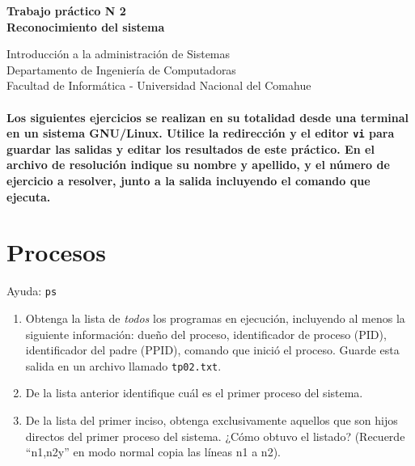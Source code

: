 \documentclass[12pt]{article}
\def\maketitle{

 \makeatletter
 {\color{bl} \centering \huge \sc \textbf{
Trabajo práctico N 2 \\
\large \vspace*{-8pt} \color{black} Reconocimiento del sistema
 \vspace*{8pt} }\par}
 \makeatother


 \makeatletter
 {\centering \small 
	Introducción a la administración de Sistemas \\
 	Departamento de Ingeniería de Computadoras \\
 	Facultad de Informática - Universidad Nacional del Comahue \\
 	\vspace{20pt} }
 \makeatother

}
\begin{document}
\thispagestyle{empty}
\maketitle
\setlength{\parindent}{0pt}

\paragraph{Los siguientes ejercicios se realizan en su totalidad desde una terminal en un sistema GNU/Linux. Utilice la redirección y el editor \texttt{vi} para guardar las salidas y editar los resultados de este práctico. En el archivo de resolución indique su nombre y apellido, y el número de ejercicio a resolver, junto a la salida incluyendo el comando que ejecuta. }

\section*{Procesos}
Ayuda: \texttt{ps}
\begin{enumerate}
\item Obtenga la lista de \textit{todos} los programas en ejecución, incluyendo al menos la siguiente información: dueño del proceso, identificador de proceso (PID), identificador del padre (PPID), comando que inició el proceso. Guarde esta salida en un archivo llamado \texttt{tp02.txt}.
\item De la lista anterior identifique cuál es el primer proceso del sistema.
\item De la lista del primer inciso, obtenga exclusivamente aquellos que son hijos directos del primer proceso del sistema. ¿Cómo obtuvo el listado? (Recuerde ``n1,n2y'' en modo normal copia las líneas n1 a n2).
\end{enumerate}
\end{document}

